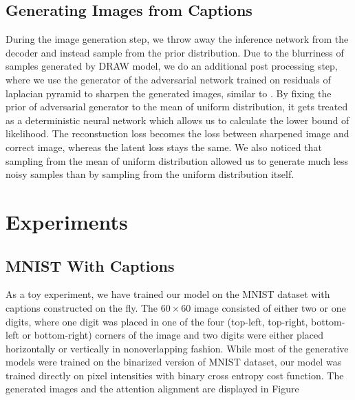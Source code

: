 \documentclass{article} %
\begin{document}
\subsection{Generating Images from Captions}

During the image generation step, we throw away the inference network from the decoder and instead sample from the prior distribution. Due to the blurriness of samples generated by DRAW model, we do an additional post processing step, where we use the generator of the adversarial network trained on residuals of laplacian pyramid to sharpen the generated images, similar to \citep{denton_lapgan}. By fixing the prior of adversarial generator to the mean of uniform distribution, it gets treated as a deterministic neural network which allows us to calculate the lower bound of likelihood. The reconstuction loss becomes the loss between sharpened image and correct image, whereas the latent loss stays the same. We also noticed that sampling from the mean of uniform distribution allowed us to generate much less noisy samples than by sampling from the uniform distribution itself.  

\section{Experiments}
\subsection{MNIST With Captions}
As a toy experiment, we have trained our model on the MNIST dataset with captions constructed on the fly. The $60 \times 60$ image consisted of either two or one digits, where one digit was placed in one of the four (top-left, top-right, bottom-left or bottom-right) corners of the image and two digits were either placed horizontally or vertically in nonoverlapping fashion. While most of the generative models were trained on the binarized version of MNIST dataset, our model was trained directly on pixel intensities with binary cross entropy cost function. The generated images and the attention alignment are displayed in Figure
\end{document}
